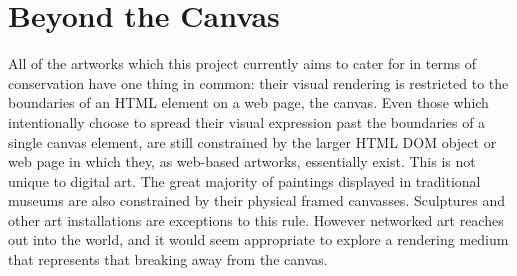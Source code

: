 \section{Beyond the Canvas}

All of the artworks which this project currently aims to cater for in terms of conservation have one thing in common: their visual rendering is restricted to the boundaries of an HTML element on a web page, the canvas. Even those which intentionally choose to spread their visual expression past the boundaries of a single canvas element, are still constrained by the larger HTML DOM object or web page in which they, as web-based artworks, essentially exist. This is not unique to digital art. The great majority of paintings displayed in traditional museums are also constrained by their physical framed canvasses. Sculptures and other art installations are exceptions to this rule. However networked art reaches out into the world, and it would seem appropriate to explore a rendering medium that represents that breaking away from the canvas.